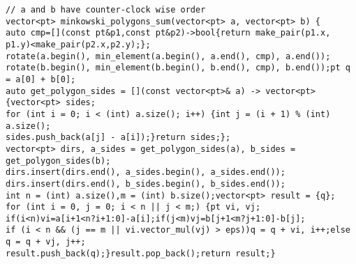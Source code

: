 \documentclass[12pt]{article}
\begin{document}
\begin{verbatim}
// a and b have counter-clock wise order
vector<pt> minkowski_polygons_sum(vector<pt> a, vector<pt> b) {
auto cmp=[](const pt&p1,const pt&p2)->bool{return make_pair(p1.x, p1.y)<make_pair(p2.x,p2.y);};
rotate(a.begin(), min_element(a.begin(), a.end(), cmp), a.end());
rotate(b.begin(), min_element(b.begin(), b.end(), cmp), b.end());pt q = a[0] + b[0];
auto get_polygon_sides = [](const vector<pt>& a) -> vector<pt> {vector<pt> sides;
for (int i = 0; i < (int) a.size(); i++) {int j = (i + 1) % (int) a.size();
sides.push_back(a[j] - a[i]);}return sides;};
vector<pt> dirs, a_sides = get_polygon_sides(a), b_sides = get_polygon_sides(b);
dirs.insert(dirs.end(), a_sides.begin(), a_sides.end());
dirs.insert(dirs.end(), b_sides.begin(), b_sides.end());
int n = (int) a.size(),m = (int) b.size();vector<pt> result = {q};
for (int i = 0, j = 0; i < n || j < m;) {pt vi, vj;
if(i<n)vi=a[i+1<n?i+1:0]-a[i];if(j<m)vj=b[j+1<m?j+1:0]-b[j];
if (i < n && (j == m || vi.vector_mul(vj) > eps))q = q + vi, i++;else q = q + vj, j++;
result.push_back(q);}result.pop_back();return result;}
\end{verbatim}
\end{document}
